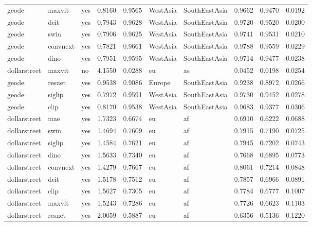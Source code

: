 \begin{table}[ht]
{\begin{tabular}{llllllllll}
geode & maxvit & yes & 0.8160 & 0.9565 & WestAsia & SouthEastAsia & 0.9662 & 0.9470 & 0.0192 \\
geode & deit & yes & 0.7943 & 0.9628 & WestAsia & SouthEastAsia & 0.9720 & 0.9520 & 0.0200 \\
geode & swin & yes & 0.7906 & 0.9625 & WestAsia & SouthEastAsia & 0.9741 & 0.9531 & 0.0210 \\
geode & convnext & yes & 0.7821 & 0.9661 & WestAsia & SouthEastAsia & 0.9788 & 0.9559 & 0.0229 \\
geode & dino & yes & 0.7951 & 0.9595 & WestAsia & SouthEastAsia & 0.9714 & 0.9477 & 0.0238 \\
dollarstreet & maxvit & no & 4.1550 & 0.0288 & eu & as & 0.0452 & 0.0198 & 0.0254 \\
geode & resnet & yes & 0.9538 & 0.9086 & Europe & SouthEastAsia & 0.9238 & 0.8972 & 0.0266 \\
geode & siglip & yes & 0.7972 & 0.9591 & WestAsia & SouthEastAsia & 0.9730 & 0.9452 & 0.0278 \\
geode & clip & yes & 0.8170 & 0.9538 & WestAsia & SouthEastAsia & 0.9683 & 0.9377 & 0.0306 \\
dollarstreet & mae & yes & 1.7323 & 0.6674 & eu & af & 0.6910 & 0.6222 & 0.0688 \\
dollarstreet & swin & yes & 1.4694 & 0.7609 & eu & af & 0.7915 & 0.7190 & 0.0725 \\
dollarstreet & siglip & yes & 1.4584 & 0.7621 & eu & af & 0.7945 & 0.7202 & 0.0743 \\
dollarstreet & dino & yes & 1.5633 & 0.7340 & eu & af & 0.7668 & 0.6895 & 0.0773 \\
dollarstreet & convnext & yes & 1.4279 & 0.7667 & eu & af & 0.8061 & 0.7214 & 0.0848 \\
dollarstreet & deit & yes & 1.5178 & 0.7512 & eu & af & 0.7857 & 0.6966 & 0.0891 \\
dollarstreet & clip & yes & 1.5627 & 0.7305 & eu & af & 0.7784 & 0.6777 & 0.1007 \\
dollarstreet & maxvit & yes & 1.5243 & 0.7286 & eu & af & 0.7726 & 0.6623 & 0.1103 \\
dollarstreet & resnet & yes & 2.0059 & 0.5887 & eu & af & 0.6356 & 0.5136 & 0.1220 \\
\bottomrule
\end{tabular}
}%
\end{table}
